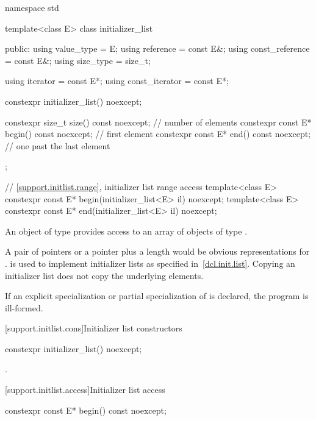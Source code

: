 \begin{codeblock}
namespace std {
  template<class E> class initializer_list {
  public:
    using value_type      = E;
    using reference       = const E&;
    using const_reference = const E&;
    using size_type       = size_t;

    using iterator        = const E*;
    using const_iterator  = const E*;

    constexpr initializer_list() noexcept;

    constexpr size_t size() const noexcept;     // number of elements
    constexpr const E* begin() const noexcept;  // first element
    constexpr const E* end() const noexcept;    // one past the last element
  };

  // \ref{support.initlist.range}, initializer list range access
  template<class E> constexpr const E* begin(initializer_list<E> il) noexcept;
  template<class E> constexpr const E* end(initializer_list<E> il) noexcept;
}
\end{codeblock}

\pnum
An object of type  provides access to an array of
objects of type . \begin{note} A pair of pointers or a pointer plus
a length would be obvious representations for .
 is used to implement initializer lists as specified
in~\ref{dcl.init.list}. Copying an initializer list does not copy the underlying
elements. \end{note}

\pnum
If an explicit specialization or partial specialization of
 is declared, the program is ill-formed.

[support.initlist.cons]{Initializer list constructors}

%
\begin{itemdecl}
constexpr initializer_list() noexcept;
\end{itemdecl}

\begin{itemdescr}
\pnum
\ensures {}.
\end{itemdescr}

[support.initlist.access]{Initializer list access}

%
\begin{itemdecl}
constexpr const E* begin() const noexcept;
\end{itemdecl}

